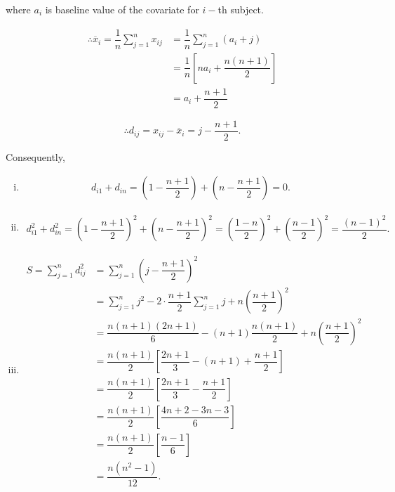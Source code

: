 \documentclass[11pt, a4paper]{article}
\begin{document}
\begin{itemize}
where $a_i$ is baseline value of the covariate for $i-$th subject.

\begin{align}\label{x_i_bar_under_assumption}
\therefore \overline{x}_i = \dfrac{1}{n} \sum\limits_{j=1}^{n} x_{ij} &= \dfrac{1}{n} \sum\limits_{j=1}^{n} (a_i + j) \nonumber \\[0.5em]
&= \dfrac{1}{n} \left[ n a_i + \dfrac{n(n+1)}{2}\right] \nonumber \\[0.5em]
&= a_i + \dfrac{n+1}{2}
\end{align}

\begin{equation}
\therefore d_{ij} = x_{ij} - \overline{x}_i = j - \dfrac{n+1}{2}.
\end{equation}

Consequently,
\begin{enumerate}[(i)]
\item \begin{align}\label{assumption_consequence_1}
d_{i1} + d_{in} = \left(1 - \dfrac{n+1}{2}\right) + \left(n - \dfrac{n+1}{2}\right) = 0.
\end{align}

\item \begin{align}\label{assumption_consequence_2}
d_{i1}^2 + d_{in}^2 = \left(1 - \dfrac{n+1}{2}\right)^2 + \left(n - \dfrac{n+1}{2}\right)^2 = \left(\dfrac{1-n}{2}\right)^2 + \left(\dfrac{n-1}{2}\right)^2 = \dfrac{(n-1)^2}{2}.
\end{align}

\item \begin{align}\label{assumption_consequence_3}
S = \sum\limits_{j=1}^{n} d_{ij}^2 
&= \sum\limits_{j=1}^{n} \left( j - \dfrac{n+1}{2}\right)^2 \nonumber \\[0.7em] 
&= \sum\limits_{j=1}^{n} j^2 - 2 \cdot \dfrac{n+1}{2} \sum\limits_{j=1}^{n} j + n \left( \dfrac{n+1}{2} \right)^2 \nonumber \\[0.7em]
&= \dfrac{n(n+1)(2n+1)}{6} - (n+1) \dfrac{n(n+1)}{2} + n \left( \dfrac{n+1}{2} \right)^2 \nonumber \\[0.7em]
&= \dfrac{n(n+1)}{2} \left[ \dfrac{2n+1}{3} - (n+1) + \dfrac{n+1}{2} \right] \nonumber \\[0.7em]
&= \dfrac{n(n+1)}{2} \left[ \dfrac{2n+1}{3} - \dfrac{n+1}{2} \right] \nonumber \\[0.7em]
&= \dfrac{n(n+1)}{2} \left[ \dfrac{4n+2-3n-3}{6} \right] \nonumber \\[0.7em]
&= \dfrac{n(n+1)}{2} \left[ \dfrac{n-1}{6} \right] \nonumber \\[0.7em]
&= \dfrac{n(n^2 - 1)}{12}.
\end{align}


\end{enumerate}
\end{itemize}
\end{document}

